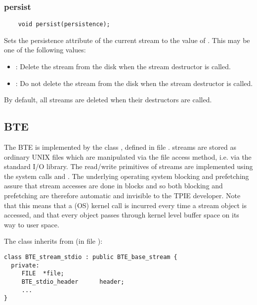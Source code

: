\subsubsection{persist}
\begin{verbatim}
    void persist(persistence);
\end{verbatim}
Sets the persistence attribute of the current stream to the
value of . This may be one of the
following values:
\begin{itemize}
\item {}: Delete the stream from the
disk when the stream 
  destructor is called.
\item {}: Do not delete the stream from the disk when
  the stream destructor is called.
\end{itemize}

By default, all streams are deleted when their destructors
are called.

\subsection{BTE }

The  BTE is implemented by the class
, defined in file
.  
streams are stored as ordinary UNIX files which are
manipulated via the  file access method, i.e.
via the standard  I/O library. The read/write
primitives of  streams are
implemented using the system calls  and
. The underlying operating system blocking
and prefetching assure that stream accesses are done in
blocks and so both blocking and prefetching are therefore
automatic and invisible to the TPIE developer.  Note that
this means that a (OS) kernel call is incurred every time a
stream object is accessed, and that every object passes
through kernel level buffer space on its way to user space.

The  class inherits from
 (in file
):
\begin{verbatim}
class BTE_stream_stdio : public BTE_base_stream {
  private:
     FILE  *file;          
     BTE_stdio_header      header;
     ...
}  
\end{verbatim}


